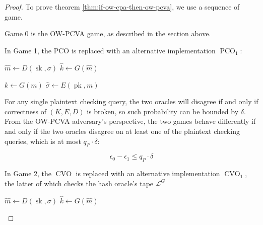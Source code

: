 \documentclass{article}
\newcommand{\pk}{\operatorname{pk}}
\newcommand{\sk}{\operatorname{sk}}
\newcommand{\pco}{\operatorname{PCO}}
\newcommand{\cvo}{\operatorname{CVO}}
\newcommand{\llbrack}{[\![}
\newcommand{\rrbrack}{]\!]}
\begin{document}
\begin{proof}
    To prove theorem \ref{thm:if-ow-cpa-then-ow-pcva}, we use a sequence of game.

    Game 0 is the OW-PCVA game, as described in the section above.

    In Game 1, the PCO is replaced with an alternative implementation $\pco_1$:

    \begin{multicols}{2}
        \begin{algorithm}[H]
            \caption{$\pco$}
            \SetAlgoLined
            $\hat{m} \leftarrow D(\sk, \sigma)$\;
            $\hat{k} \leftarrow G(\hat{m})$\;
            \Return{
                $\llbrack \hat{m} = m \rrbrack$ 
                and $\llbrack V(\hat{k}, \sigma, t) \rrbrack$
            }
        \end{algorithm}

        \begin{algorithm}[H]
            \caption{$\pco_1$}
            \SetAlgoLined
            $k \leftarrow G(m)$\;
            $\hat{\sigma} \leftarrow E(\pk, m)$\;
            \Return{
                $\llbrack \sigma = \hat{\sigma} \rrbrack$
                and $\llbrack V(k, \sigma, t) \rrbrack$
            }
        \end{algorithm}
    \end{multicols}

    For any single plaintext checking query, the two oracles will disagree if and only if correctness of $(K, E, D)$ is broken, so such probability can be bounded by $\delta$. From the OW-PCVA adversary's perspective, the two games behave differently if and only if the two oracles disagree on at least one of the plaintext checking queries, which is at most $q_P \cdot \delta$:

    \begin{equation*}
        \epsilon_0 - \epsilon_1 \leq q_P \cdot \delta
    \end{equation*}

    In Game 2, the $\cvo$ is replaced with an alternative implementation $\cvo_1$, the latter of which checks the hash oracle's tape $\mathcal{L}^G$

    \begin{multicols}{2}
        \begin{algorithm}[H]
            \caption{$\cvo$}
            \SetAlgoLined
            $\hat{m} \leftarrow D(\sk, \sigma)$\;
            $\hat{k} \leftarrow G(\hat{m})$\;
            \Return{
                $\llbrack V(\hat{k}, \sigma, t) = 1 \rrbrack$
            }
        \end{algorithm}


\end{multicols}
\end{proof}
\end{document}
